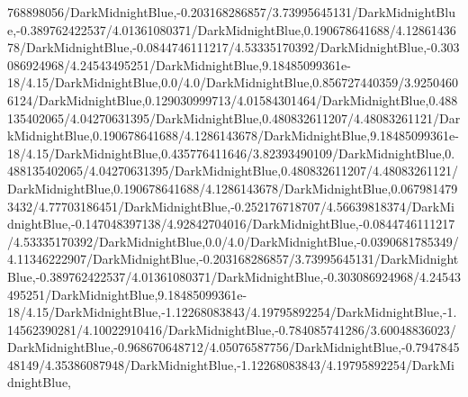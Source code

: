 {\begin{tikzternal}
{768898056/DarkMidnightBlue,-0.203168286857/3.73995645131/DarkMidnightBlue,-0.389762422537/4.01361080371/DarkMidnightBlue,0.190678641688/4.1286143678/DarkMidnightBlue,-0.0844746111217/4.53335170392/DarkMidnightBlue,-0.303086924968/4.24543495251/DarkMidnightBlue,9.18485099361e-18/4.15/DarkMidnightBlue,0.0/4.0/DarkMidnightBlue,0.856727440359/3.92504606124/DarkMidnightBlue,0.129030999713/4.01584301464/DarkMidnightBlue,0.488135402065/4.04270631395/DarkMidnightBlue,0.480832611207/4.48083261121/DarkMidnightBlue,0.190678641688/4.1286143678/DarkMidnightBlue,9.18485099361e-18/4.15/DarkMidnightBlue,0.435776411646/3.82393490109/DarkMidnightBlue,0.488135402065/4.04270631395/DarkMidnightBlue,0.480832611207/4.48083261121/DarkMidnightBlue,0.190678641688/4.1286143678/DarkMidnightBlue,0.0679814793432/4.77703186451/DarkMidnightBlue,-0.252176718707/4.56639818374/DarkMidnightBlue,-0.147048397138/4.92842704016/DarkMidnightBlue,-0.0844746111217/4.53335170392/DarkMidnightBlue,0.0/4.0/DarkMidnightBlue,-0.0390681785349/4.11346222907/DarkMidnightBlue,-0.203168286857/3.73995645131/DarkMidnightBlue,-0.389762422537/4.01361080371/DarkMidnightBlue,-0.303086924968/4.24543495251/DarkMidnightBlue,9.18485099361e-18/4.15/DarkMidnightBlue,-1.12268083843/4.19795892254/DarkMidnightBlue,-1.14562390281/4.10022910416/DarkMidnightBlue,-0.784085741286/3.60048836023/DarkMidnightBlue,-0.968670648712/4.05076587756/DarkMidnightBlue,-0.794784548149/4.35386087948/DarkMidnightBlue,-1.12268083843/4.19795892254/DarkMidnightBlue,
}
\end{tikzternal}}
